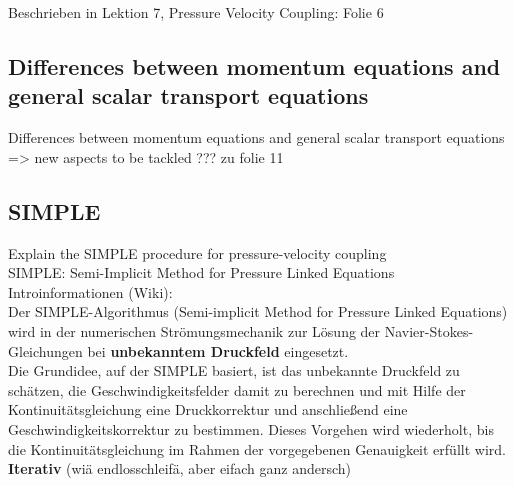 \documentclass[a4paper]{scrartcl}
\begin{document}
Beschrieben in Lektion 7, Pressure Velocity Coupling: Folie 6


\subsection{Differences between momentum equations and general scalar transport
equations} 
Differences between momentum equations and general scalar transport
equations => new aspects to be tackled ??? zu folie 11

\subsection{SIMPLE}
Explain the SIMPLE procedure for pressure-velocity coupling\\
\newline
SIMPLE: Semi-Implicit Method for Pressure Linked Equations\\
Introinformationen (Wiki):\\
Der SIMPLE-Algorithmus (Semi-implicit Method for Pressure Linked Equations) wird
in der numerischen Strömungsmechanik zur Lösung der Navier-Stokes-Gleichungen
bei \textbf{unbekanntem Druckfeld} eingesetzt.\\
Die Grundidee, auf der SIMPLE basiert, ist das unbekannte Druckfeld zu schätzen,
die Geschwindigkeitsfelder damit zu berechnen und mit Hilfe der
Kontinuitätsgleichung eine Druckkorrektur und anschließend eine
Geschwindigkeitskorrektur zu bestimmen. Dieses Vorgehen wird wiederholt, bis die
Kontinuitätsgleichung im Rahmen der vorgegebenen Genauigkeit erfüllt wird.\\
\textbf{Iterativ} (wiä endlosschleifä, aber eifach ganz andersch)\\
\end{document}

